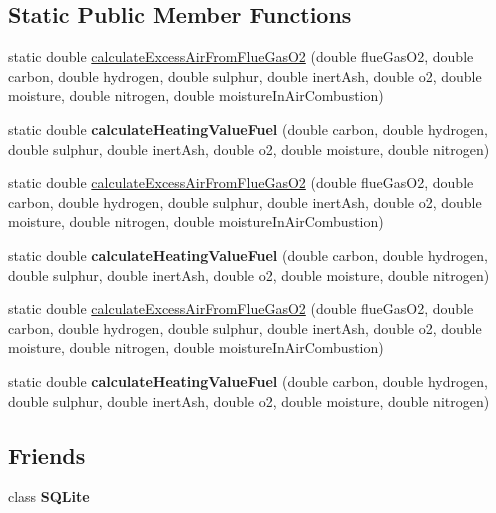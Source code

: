 \subsection*{Static Public Member Functions}
\begin{DoxyCompactItemize}
\item 
static double \hyperlink{class_solid_liquid_flue_gas_material_a57ddf04184687f8efe031986b591ad6b}{calculate\+Excess\+Air\+From\+Flue\+Gas\+O2} (double flue\+Gas\+O2, double carbon, double hydrogen, double sulphur, double inert\+Ash, double o2, double moisture, double nitrogen, double moisture\+In\+Air\+Combustion)
\item 
\mbox{\label{class_solid_liquid_flue_gas_material_aa6f11cd466965e30af4f8c30d7a5f402}} 
static double {\bfseries calculate\+Heating\+Value\+Fuel} (double carbon, double hydrogen, double sulphur, double inert\+Ash, double o2, double moisture, double nitrogen)
\item 
static double \hyperlink{class_solid_liquid_flue_gas_material_abecacec1d6f108a8cdf002a9f67972c7}{calculate\+Excess\+Air\+From\+Flue\+Gas\+O2} (double flue\+Gas\+O2, double carbon, double hydrogen, double sulphur, double inert\+Ash, double o2, double moisture, double nitrogen, double moisture\+In\+Air\+Combustion)
\item 
\mbox{\label{class_solid_liquid_flue_gas_material_a301ff1dc16086e191638b881a553539d}} 
static double {\bfseries calculate\+Heating\+Value\+Fuel} (double carbon, double hydrogen, double sulphur, double inert\+Ash, double o2, double moisture, double nitrogen)
\item 
static double \hyperlink{class_solid_liquid_flue_gas_material_abecacec1d6f108a8cdf002a9f67972c7}{calculate\+Excess\+Air\+From\+Flue\+Gas\+O2} (double flue\+Gas\+O2, double carbon, double hydrogen, double sulphur, double inert\+Ash, double o2, double moisture, double nitrogen, double moisture\+In\+Air\+Combustion)
\item 
\mbox{\label{class_solid_liquid_flue_gas_material_a301ff1dc16086e191638b881a553539d}} 
static double {\bfseries calculate\+Heating\+Value\+Fuel} (double carbon, double hydrogen, double sulphur, double inert\+Ash, double o2, double moisture, double nitrogen)
\end{DoxyCompactItemize}
\subsection*{Friends}
\begin{DoxyCompactItemize}
\item 
\mbox{\label{class_solid_liquid_flue_gas_material_a0102f3b3c0cbf96db6c49f071fa5e7cc}} 
class {\bfseries S\+Q\+Lite}
\end{DoxyCompactItemize}


